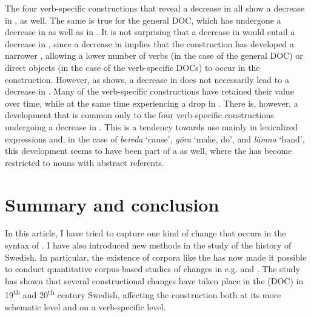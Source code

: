\documentclass[output=paper]{langscibook}
\begin{document}
The four verb-specific constructions that reveal a decrease in  all show a decrease in , as well. The same is true for the general DOC, which has undergone a decrease in  as well as in . It is not surprising that a decrease in  would entail a decrease in , since a decrease in  implies that the construction has developed a narrower , allowing a lower number of verbs (in the case of the general DOC) or direct objects (in the case of the verb-specific DOCs) to occur in the construction. However, as  shows, a decrease in  does not necessarily lead to a decrease in . Many of the verb-specific constructions have retained their  value over time, while at the same time experiencing a drop in . There is, however, a development that is common only to the four verb-specific constructions undergoing a decrease in . This is a tendency towards use mainly in lexicalized expressions and, in the case of \textit{bereda} ‘cause’, \textit{göra} ‘make, do’, and \textit{lämna} ‘hand’, this development seems to have been part of a  as well, where the  has become restricted to nouns with abstract referents.\pagebreak


\section{Summary and conclusion}\label{sec:valdeson:6}

In this article, I have tried to capture one kind of change that occurs in the syntax of . I have also introduced new methods in the study of the history of Swedish. In particular, the existence of corpora like the  has now made it possible to conduct quantitative corpus-based studies of changes in e.g.  and . The study has shown that several constructional changes have taken place in the  (DOC) in 19\textsuperscript{th} and 20\textsuperscript{th} century Swedish, affecting the construction both at its more schematic level and on a verb-specific level. 
\end{document}
